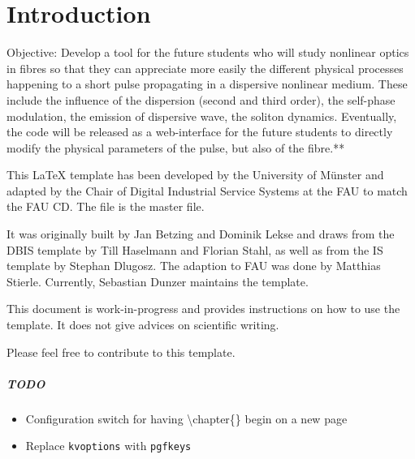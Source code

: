 \chapter{Introduction}
Objective:
Develop a tool for the future students who will study nonlinear optics in fibres so that they can appreciate more easily the different physical processes happening to a short pulse propagating in a dispersive nonlinear medium. These include the influence of the dispersion (second and third order), the self-phase modulation, the emission of dispersive wave, the soliton dynamics. Eventually, the code will be released as a web-interface for the future students to directly modify the physical parameters of the pulse, but also of the fibre.**



This \LaTeX \- template has been developed by the University of M\"unster and adapted by the Chair of Digital Industrial Service Systems at the \gls{FAU} to match the \gls{FAU} \gls{CD}. The file  is the master file.

It was originally built by  Jan Betzing and Dominik Lekse and draws from the DBIS template by Till Haselmann and Florian Stahl, as well as from the IS template by Stephan Dlugosz. The adaption to FAU was done by Matthias Stierle. Currently, Sebastian Dunzer maintains the template.

This document is work-in-progress and provides instructions on how to use the template. It does not give advices on scientific writing.

Please feel free to contribute to this template.

\paragraph{TODO}
\begin{itemize}
	\item Configuration switch for having \textbackslash chapter\{\} begin on a new page
	\item Replace \texttt{kvoptions} with \texttt{pgfkeys}
\end{itemize}